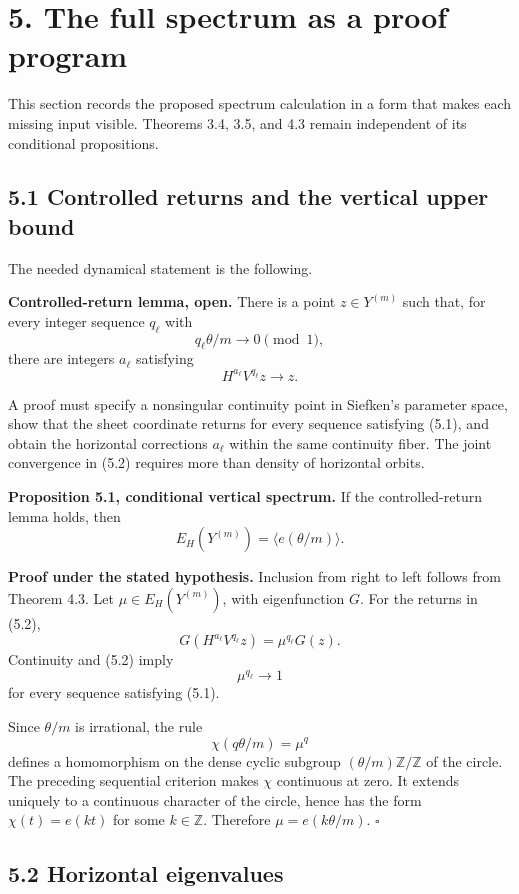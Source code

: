 \documentclass[11pt]{article}
\begin{document}
\section*{5. The full spectrum as a proof program}

This section records the proposed spectrum calculation in a form that makes
each missing input visible. Theorems 3.4, 3.5, and 4.3 remain independent of
its conditional propositions.

\subsection*{5.1 Controlled returns and the vertical upper bound}

The needed dynamical statement is the following.

\textbf{Controlled-return lemma, open.} There is a point \(z\in Y^{(m)}\) such
that, for every integer sequence \(q_\ell\) with
\[
  q_\ell\theta/m\longrightarrow0\pmod1,
  \tag{5.1}
\]
there are integers \(a_\ell\) satisfying
\[
  H^{a_\ell}V^{q_\ell}z\longrightarrow z.
  \tag{5.2}
\]

A proof must specify a nonsingular continuity point in Siefken's parameter
space, show that the sheet coordinate returns for every sequence satisfying
(5.1), and obtain the horizontal corrections \(a_\ell\) within the same
continuity fiber. The joint convergence in (5.2) requires more than density
of horizontal orbits.

\textbf{Proposition 5.1, conditional vertical spectrum.} If the controlled-return
lemma holds, then
\[
  E_H(Y^{(m)})=\langle e(\theta/m)\rangle.
  \tag{5.3}
\]

\textbf{Proof under the stated hypothesis.} Inclusion from right to left follows
from Theorem 4.3. Let \(\mu\in E_H(Y^{(m)})\), with eigenfunction \(G\).
For the returns in (5.2),
\[
  G(H^{a_\ell}V^{q_\ell}z)=\mu^{q_\ell}G(z).
\]
Continuity and (5.2) imply
\[
  \mu^{q_\ell}\longrightarrow1
\]
for every sequence satisfying (5.1).

Since \(\theta/m\) is irrational, the rule
\[
  \chi(q\theta/m)=\mu^q
\]
defines a homomorphism on the dense cyclic subgroup
\((\theta/m)\mathbb Z/\mathbb Z\) of the circle. The preceding sequential
criterion makes \(\chi\) continuous at zero. It extends uniquely to a
continuous character of the circle, hence has the form
\(\chi(t)=e(kt)\) for some \(k\in\mathbb Z\). Therefore
\(\mu=e(k\theta/m)\). \(\square\)

\subsection*{5.2 Horizontal eigenvalues}
\end{document}
